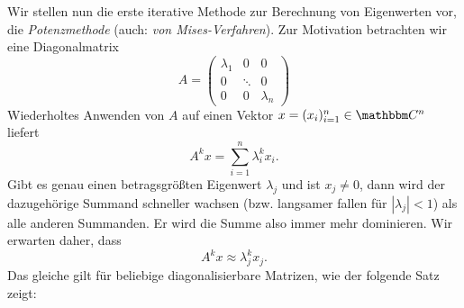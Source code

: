 \documentclass[12pt,a4paper]{book}
\theoremstyle{break}
\theoremstyle{nonumberplain}
\newcommand{\C}{\mathbbm C}
\newcommand{\1}{\mathbbm{1}} 			      	%
\begin{document}
Wir stellen nun die erste iterative Methode zur Berechnung von Eigenwerten vor, die \emph{Potenzmethode} (auch: \emph{von Mises-Verfahren}).
 Zur Motivation betrachten wir eine
Diagonalmatrix 
\[
A=\begin{pmatrix} \lambda_1 & 0 & 0\\ 0 & \ddots & 0\\ 0 & 0 & \lambda_n\end{pmatrix}
\]
Wiederholtes Anwenden von $A$ auf einen Vektor $x=(x_i)_{i=1}^n\in \C^n$ liefert
\[
A^k x=\sum_{i=1}^n \lambda_i^k x_i.
\]
Gibt es genau einen betragsgrößten Eigenwert $\lambda_j$ und ist $x_j\neq 0$, dann wird der dazugehörige Summand schneller
wachsen (bzw. langsamer fallen für $|\lambda_j|<1$) als alle anderen Summanden. Er wird die Summe also immer mehr dominieren.
Wir erwarten daher, dass
\[
A^k x\approx \lambda_j^k x_j.
\]
Das gleiche gilt für beliebige diagonalisierbare Matrizen, wie der folgende Satz zeigt:
\end{document}

